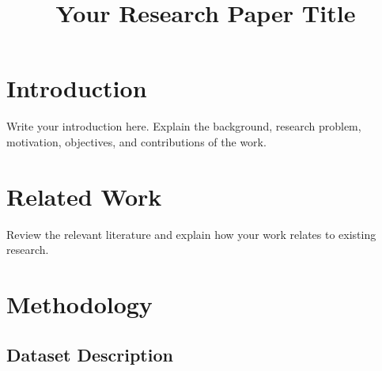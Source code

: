 \documentclass[pdflatex,sn-mathphys-num]{sn-jnl}
\theoremstyle{thmstyleone}
\theoremstyle{thmstyletwo}
\theoremstyle{thmstylethree}
\begin{document}

\title[Short Title]{Your Research Paper Title}

\author*[1]{ }






\maketitle


\section{Introduction}\label{sec:introduction}
Write your introduction here. Explain the background, research problem, motivation, objectives, and contributions of the work.

\section{Related Work}\label{sec:related-work}

Review the relevant literature and explain how your work relates to existing research.

\section{Methodology}\label{sec:methodology}

\subsection{Dataset Description}\label{subsec:dataset}
\end{document}
